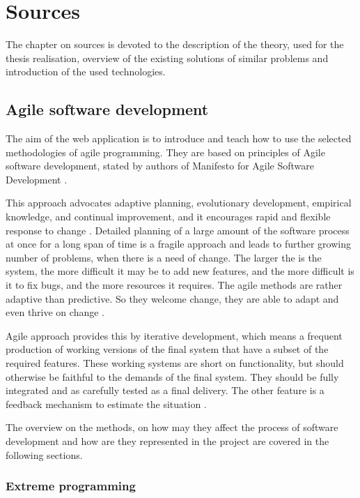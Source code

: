 \chapter{Sources}

\label{ch:sources}

The chapter on sources is devoted to the description of the theory, used for the thesis realisation, overview of the existing solutions of similar problems and introduction of the used technologies.

\section{Agile software development}

The aim of the web application is to introduce and teach how to use the selected methodologies of agile programming. They are based on principles of Agile software development, stated by authors of Manifesto for Agile Software Development \cite{manifesto}.

This approach advocates adaptive planning, evolutionary development, empirical knowledge, and continual improvement, and it encourages rapid and flexible response to change \cite{swdev}. Detailed planning of a large amount of the software process at once for a long span of time is a fragile approach and leads to further growing number of problems, when there is a need of change. The larger the is the system, the more difficult it may be to add new features, and the more difficult is it to fix bugs, and the more resources it requires. The agile methods are rather adaptive than predictive. So they welcome change, they are able to adapt and even thrive on change \cite[From Nothing, to Monumental, to Agile]{agile_fowler}. 

Agile approach provides this by iterative development, which means a frequent production of working versions of the final system that have a subset of the required features. These working systems are short on functionality, but should otherwise be faithful to the demands of the final system. They should be fully integrated and as carefully tested as a final delivery. The other feature is a feedback mechanism to estimate the situation \cite[Controlling an Unpredictable Process - Iterations]{agile_fowler}. 

The overview on the methods, on how may they affect the process of software development and how are they represented in the project are covered in the following sections.

\subsection{Extreme programming}

